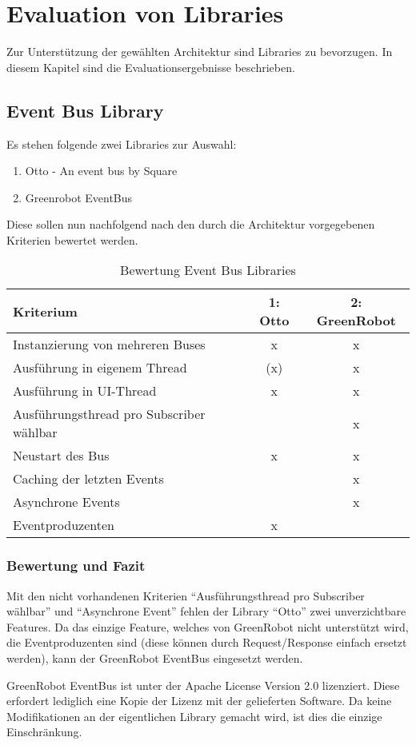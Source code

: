 \section{Evaluation von Libraries}
\label{sec:Evaluation von Libraries}
Zur Unterstützung der gewählten Architektur sind Libraries zu bevorzugen. In diesem Kapitel sind die Evaluationsergebnisse beschrieben.

\subsection{Event Bus Library}
Es stehen folgende zwei Libraries zur Auswahl:
\begin{enumerate}
\item Otto - An event bus by Square
\item Greenrobot EventBus
\end{enumerate}
Diese sollen nun nachfolgend nach den durch die Architektur vorgegebenen Kriterien bewertet werden.

\begin{table}[H]
\begin{tabular}{|p{8cm}|c|c|}
 \hline 
\textbf{Kriterium} & \textbf{1: Otto} & \textbf{2: GreenRobot} 
\\ \hline

Instanzierung von mehreren Buses & x & x
\\ \hline

Ausführung in eigenem Thread & (x) & x
\\ \hline

Ausführung in \ac{UI}-Thread & x & x
\\ \hline

Ausführungsthread pro Subscriber wählbar &   & x
\\ \hline

Neustart des Bus & x & x
\\ \hline

Caching der letzten Events &   & x
\\ \hline

Asynchrone Events &   & x
\\ \hline

Eventproduzenten & x & 
\\ \hline

\end{tabular}
\caption{Bewertung Event Bus Libraries}
\end{table}

\subsubsection{Bewertung und Fazit}
Mit den nicht vorhandenen Kriterien \enquote{Ausführungsthread pro Subscriber wählbar} und \enquote{Asynchrone Event} fehlen der Library \enquote{Otto} zwei unverzichtbare Features. Da das einzige Feature, welches von GreenRobot nicht unterstützt wird, die Eventproduzenten sind (diese können durch Request/Response einfach ersetzt werden), kann der GreenRobot EventBus eingesetzt werden.

GreenRobot EventBus ist unter der Apache License \cite{apache_license} Version 2.0  lizenziert. Diese erfordert lediglich eine Kopie der Lizenz mit der gelieferten Software. Da keine Modifikationen an der eigentlichen Library gemacht wird, ist dies die einzige Einschränkung.